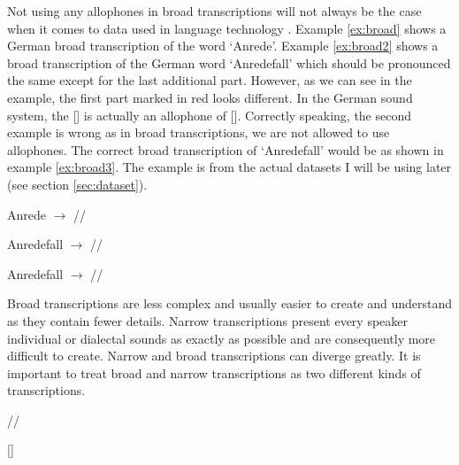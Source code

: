 Not using any allophones in broad transcriptions will not always be the case when it comes to data used in language technology \citep{Lee&Ashby.2020}. Example \ref{ex:broad} shows a German broad transcription of the word `Anrede'. Example \ref{ex:broad2} shows a broad transcription of the German word `Anredefall' which should be pronounced the same except for the last additional part. However, as we can see in the example, the first part marked in red looks different. In the German sound system, the [] is actually an allophone of []. Correctly speaking, the second example is wrong as in broad transcriptions, we are not allowed to use allophones. The correct broad transcription of `Anredefall' would be as shown in example \ref{ex:broad3}. The example is from the actual datasets I will be using later (see section \ref{sec:dataset}).

\begin{covsubexamples}
\label{ex:ipa}
\item \label{ex:broad} Anrede $\rightarrow$ // %
\item \label{ex:broad2} Anredefall $\rightarrow$ // %
\item \label{ex:broad3} Anr{\color{orange}e}d{\color{orange}e}fall $\rightarrow$ // %
\end{covsubexamples}

Broad transcriptions are less complex and usually easier to create and understand as they contain fewer details. Narrow transcriptions present every speaker individual or dialectal sounds as exactly as possible and are consequently more difficult to create. Narrow and broad transcriptions can diverge greatly. It is important to treat broad and narrow transcriptions as two different kinds of transcriptions. 

\begin{covexamples}
\item \label{exBro} //
\item \label{exNar} []
\end{covexamples}

